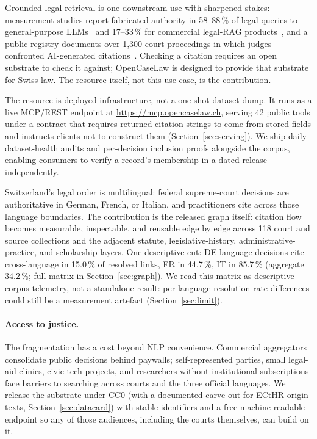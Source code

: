 \documentclass[11pt,a4paper]{article}
\begin{document}
Grounded legal retrieval is one downstream use with sharpened stakes: measurement studies report fabricated authority in 58--88\,\% of legal queries to general-purpose LLMs~\cite{dahl2024} and 17--33\,\% for commercial legal-RAG products~\cite{magesh2024}, and a public registry documents over 1{,}300 court proceedings in which judges confronted AI-generated citations~\cite{charlotin2026}. Checking a citation requires an open substrate to check it against; OpenCaseLaw is designed to provide that substrate for Swiss law. The resource itself, not this use case, is the contribution.

The resource is deployed infrastructure, not a one-shot dataset dump. It runs as a live MCP/REST endpoint at \url{https://mcp.opencaselaw.ch}, serving 42 public tools under a contract that requires returned citation strings to come from stored fields and instructs clients not to construct them (Section~\ref{sec:serving}). We ship daily dataset-health audits and per-decision inclusion proofs alongside the corpus, enabling consumers to verify a record's membership in a dated release independently.

Switzerland's legal order is multilingual: federal supreme-court decisions are authoritative in German, French, or Italian, and practitioners cite across those language boundaries. The contribution is the released graph itself: citation flow becomes measurable, inspectable, and reusable edge by edge across 118 court and source collections and the adjacent statute, legislative-history, administrative-practice, and scholarship layers. One descriptive cut: DE-language decisions cite cross-language in 15.0\,\% of resolved links, FR in 44.7\,\%, IT in 85.7\,\% (aggregate 34.2\,\%; full matrix in Section~\ref{sec:graph}). We read this matrix as descriptive corpus telemetry, not a standalone result: per-language resolution-rate differences could still be a measurement artefact (Section~\ref{sec:limit}).

\paragraph{Access to justice.} The fragmentation has a cost beyond NLP convenience. Commercial aggregators consolidate public decisions behind paywalls; self-represented parties, small legal-aid clinics, civic-tech projects, and researchers without institutional subscriptions face barriers to searching across courts and the three official languages. We release the substrate under CC0 (with a documented carve-out for ECtHR-origin texts, Section~\ref{sec:datacard}) with stable identifiers and a free machine-readable endpoint so any of those audiences, including the courts themselves, can build on it.
\end{document}
